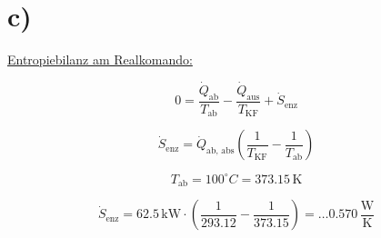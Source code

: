 

\section*{c)}
\underline{Entropiebilanz am Realkomando:}

\[
0 = \frac{\dot{Q}_{\text{ab}}}{T_{\text{ab}}} - \frac{\dot{Q}_{\text{aus}}}{T_{\text{KF}}} + \dot{S}_{\text{enz}}
\]

\[
\dot{S}_{\text{enz}} = \dot{Q}_{\text{ab, abs}} \left( \frac{1}{T_{\text{KF}}} - \frac{1}{T_{\text{ab}}} \right)
\]

\[
T_{\text{ab}} = 100^\circ C = 373.15 \, \text{K}
\]

\[
\dot{S}_{\text{enz}} = 62.5 \, \text{kW} \cdot \left( \frac{1}{293.12} - \frac{1}{373.15} \right) = \dots 0.570 \, \frac{\text{W}}{\text{K}}
\]